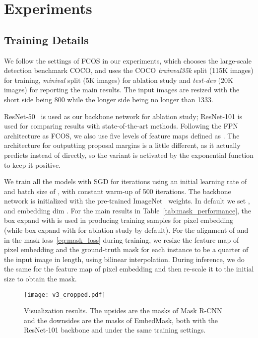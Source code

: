 \documentclass[10pt,twocolumn,letterpaper]{article}
\begin{document}
\section{Experiments}

\subsection{Training Details}

\medbreak
{}
We follow the settings of FCOS in our experiments, which chooses the large-scale detection benchmark COCO, and uses the COCO \textit{trainval35k} split (115K images) for training, \textit{minival} split (5K images) for ablation study and \textit{test-dev} (20K images) for reporting the main results. 
The input images are resized with the short side being 800 while the longer side being no longer than 1333.

\medbreak
{}
ResNet-50~\cite{he2016deep} is used as our backbone network for ablation study; ResNet-101 is used for comparing results with state-of-the-art methods. 
Following the FPN architecture as FCOS, we also use five levels of feature maps defined as .
The architecture for outputting proposal margins is a little different, as it actually predicts  instead of  directly, so the variant is activated by the exponential function to keep it positive. 

\medbreak
{}
We train all the models with SGD for  iterations using an initial learning rate of  and batch size of , with constant warm-up of 500 iterations. 
The backbone network is initialized with the pre-trained ImageNet~\cite{deng2009imagenet} weights. 
In default we set ,  and embedding dim . 
For the main results in Table~\ref{tab:mask_performance}, the box expand with  is used in producing training samples  for pixel embedding (while box expand with  for ablation study by default).
For the alignment of  and  in the mask loss~\ref{eq:mask_loss} during training, we resize the feature map of pixel embedding and the ground-truth mask for each instance to be a quarter of the input image in length, using  bilinear interpolation. 
During inference, we do the same for the feature map of pixel embedding and then re-scale it to the initial size to obtain the mask.

\begin{figure*}
   \begin{center}
      \texttt{[image: v3\_cropped.pdf]}
   \end{center}\vspace{-0.1in}
      \caption{Visualization results. The upsides are the masks of Mask R-CNN and the downsides are the masks of EmbedMask, both with the ResNet-101 backbone and under the same training settings.}
   \label{fig:vis}
\end{figure*}
\end{document}
